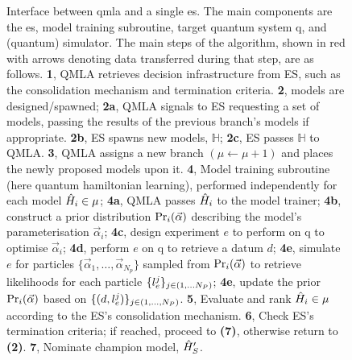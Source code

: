 \begin{figure}
\begin{center}
\begin{tikzpicture}[node distance=2.25cm]
    \end{tikzpicture}
    \end{center}
    
    \caption[Interface between QMLA and a single exploration strategy]{
        Interface between \acrfull{qmla} and a single \acrfull{es}.
        The main components are the \gls{es}, model training subroutine, target quantum system \gls{q}, 
        and (quantum) simulator. 
        The main steps of the algorithm, shown in red with arrows denoting data transferred during that step, are as follows.
        \textbf{1}, QMLA retrieves decision infrastructure from ES, such as the consolidation mechanism and termination criteria.
        \textbf{2}, models are designed/spawned; 
        \textbf{2a}, QMLA signals to ES requesting a set of models, passing the results of the previous branch's models if appropriate.
        \textbf{2b}, ES spawns new models, $\mathbb{H}$;
        \textbf{2c}, ES passes $\mathbb{H}$ to QMLA. 
        \textbf{3}, QMLA assigns a new branch $(\mu \gets \mu + 1)$ and places the newly proposed models upon it.
        \textbf{4}, Model training subroutine (here quantum \gls{hamiltonian} learning), performed independently for each model $\hi \in \mu$; 
        \textbf{4a}, QMLA passes $\hi$ to the model trainer; 
        \textbf{4b}, construct a prior distribution $\Pr_{i}(\al)$ describing the model's parameterisation $\vec{\alpha}_i$;
        \textbf{4c}, design \gls{experiment} $e$ to perform on \gls{q} to optimise $\vec{\alpha}_i$;
        \textbf{4d}, perform $e$ on \gls{q} to retrieve a datum $d$;
        \textbf{4e}, simulate $e$ for \glspl{particle} $\{ \vec{\alpha}_1, \dots , \vec{\alpha}_{N_p} \}$ 
            sampled from $\Pr_{i}(\al)$ to retrieve \glspl{likelihood} for each particle 
            $\{\lk_{e}^{j}\}_{j \in \left(1, \dots N_P\right)} $;
        \textbf{4e}, update the prior $\Pr_{i}(\al)$ based on 
            $ \{(d, \lk_{e}^j) \}_{j \in \left( 1, \dots, N_P \right)}$.
        \textbf{5}, Evaluate and rank $\hi \in \mu$ according to the ES's consolidation mechanism.
        \textbf{6}, Check ES's termination criteria; if reached, proceed to \textbf{(7)}, otherwise return to \textbf{(2)}.
        \textbf{7}, Nominate \gls{champion model}, $\hp_{S}$.        
    }
    \label{fig:qmla_flow}
\end{figure}

   